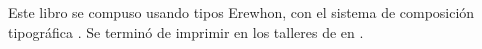 
\startmakeup[colofon]
  \obeylines
  Este libro se compuso
  usando tipos Erewhon,
  con el sistema de composición
  tipográﬁca \from[ctx].
  Se terminó de imprimir
  en los talleres de 
  en .
\stopmakeup
